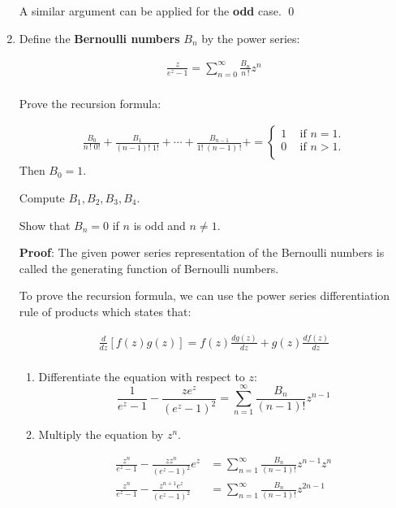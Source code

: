 \begin{enumerate}
    A similar argument can be applied for the \textbf{odd} case.
    \qed
  
    \item Define the \textbf{Bernoulli numbers} $B_n$ by the power series:
  
    \begin{align*}
      \frac{z}{e^z - 1} = \sum_{n = 0}^{\infty}\frac{B_n}{n\,!}z^n \\
    \end{align*}
  
    Prove the recursion formula:
  
    \begin{align*}
      \frac{B_0}{n \, ! \; 0!} + \frac{B_1}{(n - 1)! \; 1!} + \cdots + \frac{B_{n - 1}}{1! \; (n - 1)\,!} + = 
      \begin{cases}
        1 \;\;\; \text{   if } n = 1. \\
        0 \;\;\; \text{   if } n > 1. \\
      \end{cases}
    \end{align*}
    Then $B_0 = 1.$
    
    Compute $B_1, B_2, B_3, B_4.$
    
    Show that $B_n = 0$ if $n$ is odd and $n \not = 1.$

    \textbf{Proof}:
    The given power series representation of the Bernoulli numbers is called the 
    generating function of Bernoulli numbers.

    To prove the recursion formula, we can use the power series differentiation rule of products
    which states that:

    \begin{align*}
      \frac{d}{dz}[f(z)g(z)] = f(z)\frac{dg(z)}{dz}+ g(z)\frac{df(z)}{dz} \\
    \end{align*}

    \begin{enumerate}

      \item Differentiate the equation with respect to $z$:
      \[\frac{1}{e^z - 1} - \frac{ze^z}{(e^z - 1)^2} = \sum_{n = 1}^{\infty}\frac{B_n}{(n-1)!}z^{n-1}\]

      \item Multiply the equation by $z^n$.
      
      \begin{align*}
        \frac{z^n}{e^z - 1} - \frac{z z^n}{(e^z - 1)^2}e^z &= \sum_{n = 1}^{\infty}\frac{B_n}{(n-1)!}z^{n-1} z^n \\
        \frac{z^n}{e^z - 1} - \frac{z^{n + 1} e^z}{(e^z - 1)^2} &= \sum_{n = 1}^{\infty}\frac{B_n}{(n-1)!}z^{2n-1} \\
      \end{align*}


\end{enumerate}
\end{enumerate}
